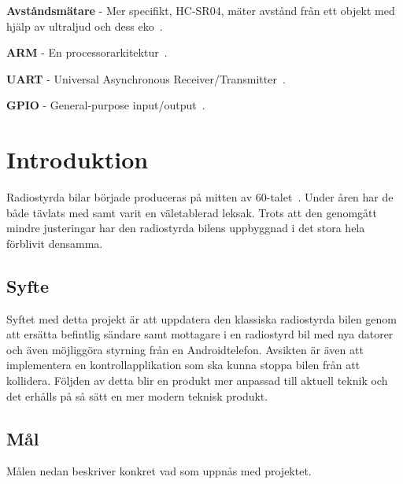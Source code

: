 \documentclass[a4paper]{article}
\begin{document}
\vspace{5mm} \noindent
{\bf Avståndsmätare} - Mer specifikt, HC-SR04, mäter avstånd från ett objekt med hjälp av ultraljud och dess eko~\cite{DistMeasure}.

\vspace{5mm} \noindent
{\bf ARM} - En processorarkitektur~\cite{chalmersARM}.

\vspace{5mm} \noindent
{\bf UART} - Universal Asynchronous Receiver/Transmitter~\cite{chalmersARM}.


\vspace{5mm} \noindent
{\bf GPIO} - General-purpose input/output~\cite{chalmersARM}.



\newpage
\section{Introduktion}

Radiostyrda bilar började produceras på mitten av 60-talet~\cite{RCHistory}. Under åren har de både tävlats med samt varit en väletablerad leksak. Trots att den genomgått mindre justeringar har den radiostyrda bilens uppbyggnad i det stora hela förblivit densamma.

\subsection{Syfte}

Syftet med detta projekt är att uppdatera den klassiska radiostyrda bilen genom att ersätta befintlig sändare samt mottagare i en radiostyrd bil med nya datorer och även möjliggöra styrning från en Androidtelefon. Avsikten är även att implementera en kontrollapplikation som ska kunna stoppa bilen från att kollidera. Följden av detta blir en produkt mer anpassad till aktuell teknik och det erhålls på så sätt en mer modern teknisk produkt.



\subsection{Mål}
Målen nedan beskriver konkret vad som uppnås med projektet.
\end{document}
